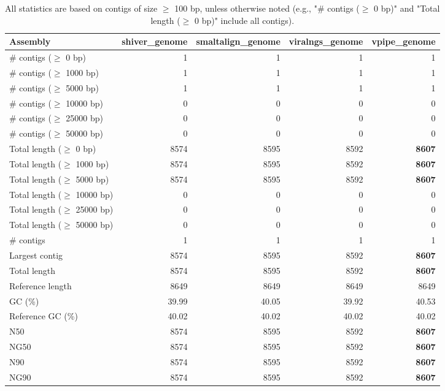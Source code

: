 \documentclass[12pt,a4paper]{article}
\begin{document}
\begin{table}[ht]
\begin{center}
\caption{All statistics are based on contigs of size $\geq$ 100 bp, unless otherwise noted (e.g., "\# contigs ($\geq$ 0 bp)" and "Total length ($\geq$ 0 bp)" include all contigs).}
\begin{tabular}{|l*{4}{|r}|}
\hline
Assembly & shiver\_genome & smaltalign\_genome & viralngs\_genome & vpipe\_genome \\ \hline
\# contigs ($\geq$ 0 bp) & 1 & 1 & 1 & 1 \\ \hline
\# contigs ($\geq$ 1000 bp) & 1 & 1 & 1 & 1 \\ \hline
\# contigs ($\geq$ 5000 bp) & 1 & 1 & 1 & 1 \\ \hline
\# contigs ($\geq$ 10000 bp) & 0 & 0 & 0 & 0 \\ \hline
\# contigs ($\geq$ 25000 bp) & 0 & 0 & 0 & 0 \\ \hline
\# contigs ($\geq$ 50000 bp) & 0 & 0 & 0 & 0 \\ \hline
Total length ($\geq$ 0 bp) & 8574 & 8595 & 8592 & {\bf 8607} \\ \hline
Total length ($\geq$ 1000 bp) & 8574 & 8595 & 8592 & {\bf 8607} \\ \hline
Total length ($\geq$ 5000 bp) & 8574 & 8595 & 8592 & {\bf 8607} \\ \hline
Total length ($\geq$ 10000 bp) & 0 & 0 & 0 & 0 \\ \hline
Total length ($\geq$ 25000 bp) & 0 & 0 & 0 & 0 \\ \hline
Total length ($\geq$ 50000 bp) & 0 & 0 & 0 & 0 \\ \hline
\# contigs & 1 & 1 & 1 & 1 \\ \hline
Largest contig & 8574 & 8595 & 8592 & {\bf 8607} \\ \hline
Total length & 8574 & 8595 & 8592 & {\bf 8607} \\ \hline
Reference length & 8649 & 8649 & 8649 & 8649 \\ \hline
GC (\%) & 39.99 & 40.05 & 39.92 & 40.53 \\ \hline
Reference GC (\%) & 40.02 & 40.02 & 40.02 & 40.02 \\ \hline
N50 & 8574 & 8595 & 8592 & {\bf 8607} \\ \hline
NG50 & 8574 & 8595 & 8592 & {\bf 8607} \\ \hline
N90 & 8574 & 8595 & 8592 & {\bf 8607} \\ \hline
NG90 & 8574 & 8595 & 8592 & {\bf 8607} \\ \hline

\end{tabular}
\end{center}
\end{table}
\end{document}
